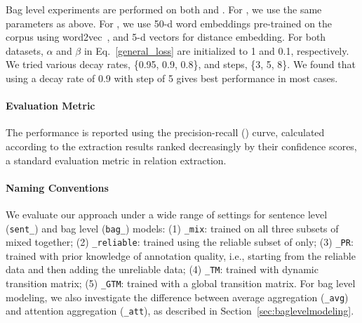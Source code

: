 Bag level experiments are performed on both  \TimeRE and  \EntityRE. For \TimeRE, we use the same parameters as above.
For \EntityRE, we use 50-d word embeddings pre-trained on the \NYT corpus using word2vec~\cite{mikolov2013distributed}, 
and 5-d vectors for distance embedding.
For both datasets,  $\alpha$ and $\beta$ in Eq.~\ref{general_loss} are initialized to 1 and 0.1, respectively. We tried various decay rates, \{0.95, 0.9, 0.8\}, and steps, \{3, 5, 8\}. We found that using a decay rate of 0.9 with step of 5 gives best performance in most cases.

\paragraph{Evaluation Metric}
The performance is reported using the precision-recall (\PR) curve, calculated according to the extraction results ranked decreasingly by their confidence scores, a standard evaluation metric in relation extraction.

\paragraph{Naming Conventions}
We evaluate our approach under a wide range of settings for
 sentence level
(\texttt{sent\_}) and bag level (\texttt{bag\_}) models:
(1) \texttt{\_mix}:  trained on all three subsets of \TimeRE mixed together;
(2) \texttt{\_reliable}:  trained using the reliable subset of \TimeRE only;
(3) \texttt{\_PR}:  trained with prior knowledge of annotation quality, i.e., starting from the reliable data and then adding the unreliable data;
(4) \texttt{\_TM}: trained with dynamic transition matrix;
(5) \texttt{\_GTM}:  trained with a global transition matrix.
%
%
For bag level modeling, we also investigate the difference   %
between average aggregation (\texttt{\_avg})
and attention aggregation (\texttt{\_att}), as described in Section~\ref{sec:baglevelmodeling}.



